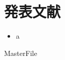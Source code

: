 \documentclass[a4j,12pt]{thesis} %
\begin{document}
\setlength{\baselineskip}{1.95zw}
\setlength{\textheight}{30\baselineskip}
\backmatter

\fi

\chapter{発表文献}

\begin{itemize}
\item a
\end{itemize}

\clearpage


\expandafter\ifx\csname MasterFile\endcsname\relax
\def\MasterFile{本原稿です}
\end{document}
